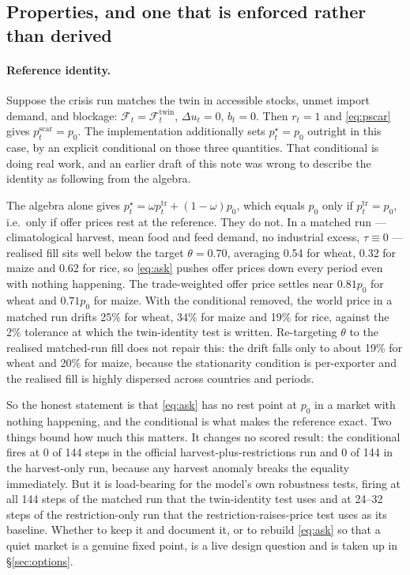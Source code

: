 \subsection{Properties, and one that is enforced rather than derived}

\paragraph{Reference identity.}
Suppose the crisis run matches the twin in accessible stocks, unmet import
demand, and blockage: \(\mathcal{F}_t=\mathcal{F}^{\mathrm{twin}}_t\),
\(\Delta u_t=0\), \(b_t=0\). Then \(r_t=1\) and \eqref{eq:pscar} gives
\(p^{\mathrm{scar}}_t=p_0\). The implementation additionally sets
\(p^{\star}_t=p_0\) outright in this case, by an explicit conditional on
those three quantities. That conditional is doing real work, and an earlier
draft of this note was wrong to describe the identity as following from the
algebra.

The algebra alone gives
\(p^{\star}_t=\omega p^{\mathrm{tr}}_t+(1-\omega)p_0\), which equals
\(p_0\) only if \(p^{\mathrm{tr}}_t=p_0\), i.e.\ only if offer prices rest
at the reference. They do not. In a matched run --- climatological harvest,
mean food and feed demand, no industrial excess, \(\tau\equiv 0\) ---
realised fill sits well below the target \(\theta=0.70\), averaging 0.54
for wheat, 0.32 for maize and 0.62 for rice, so \eqref{eq:ask} pushes offer
prices down every period even with nothing happening. The trade-weighted
offer price settles near \(0.81p_0\) for wheat and \(0.71p_0\) for maize.
With the conditional removed, the world price in a matched run drifts 25\%
for wheat, 34\% for maize and 19\% for rice, against the 2\% tolerance at
which the twin-identity test is written. Re-targeting \(\theta\) to the
realised matched-run fill does not repair this: the drift falls only to
about 19\% for wheat and 20\% for maize, because the stationarity condition
is per-exporter and the realised fill is highly dispersed across countries
and periods.

So the honest statement is that \eqref{eq:ask} has no rest point at \(p_0\)
in a market with nothing happening, and the conditional is what makes the
reference exact. Two things bound how much this matters. It changes no
scored result: the conditional fires at 0 of 144 steps in the official
harvest-plus-restrictions run and 0 of 144 in the harvest-only run, because
any harvest anomaly breaks the equality immediately. But it is load-bearing
for the model's own robustness tests, firing at all 144 steps of the matched
run that the twin-identity test uses and at 24--32 steps of the
restriction-only run that the restriction-raises-price test uses as its
baseline. Whether to keep it and document it, or to rebuild \eqref{eq:ask}
so that a quiet market is a genuine fixed point, is a live design question
and is taken up in \S\ref{sec:options}.

